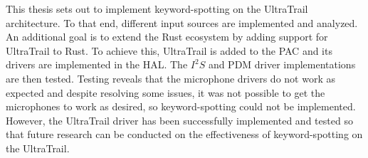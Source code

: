 
This thesis sets out to implement keyword-spotting on the UltraTrail architecture.
To that end, different input sources are implemented and analyzed.
An additional goal is to extend the Rust ecosystem by adding support for UltraTrail to Rust.
To achieve this, UltraTrail is added to the PAC and its drivers are implemented in the HAL.
The $I^2S$ and PDM driver implementations are then tested.
Testing reveals that the microphone drivers do not work as expected and despite
resolving some issues, it was not possible to get the microphones to work as desired,
so keyword-spotting could not be implemented.
However, the UltraTrail driver has been successfully implemented and tested so that
future research can be conducted on the effectiveness of keyword-spotting on the UltraTrail.
